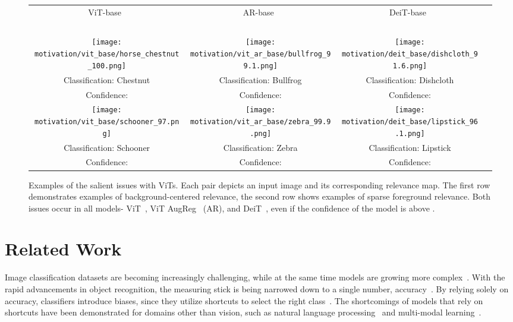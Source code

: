 \documentclass{article}
\begin{document}
\begin{figure*}[t]
  \centering
\begin{tabular}{c@{~~~~~~~~~~}c@{~~~~~~~~~~}c@{~}c}
ViT-base~\cite{dosovitskiy2020image} & AR-base~\cite{Steiner2021HowTT} & DeiT-base~\cite{touvron2020training}\\
~\\
\texttt{[image: motivation/vit\_base/horse\_chestnut\_100.png]}&
\texttt{[image: motivation/vit\_ar\_base/bullfrog\_99.1.png]}&
\texttt{[image: motivation/deit\_base/dishcloth\_91.6.png]}
\\
\small{Classification: Chestnut} &
\small{Classification: Bullfrog} &
\small{Classification: Dishcloth}
\\
\small{Confidence: } &
\small{Confidence: }
&
\small{Confidence: }
\\
\texttt{[image: motivation/vit\_base/schooner\_97.png]}&
\texttt{[image: motivation/vit\_ar\_base/zebra\_99.9.png]}&

\texttt{[image: motivation/deit\_base/lipstick\_96.1.png]}
\\
\small{Classification: Schooner} &
\small{Classification: Zebra} &
\small{Classification: Lipstick}
\\
\small{Confidence: } &
\small{Confidence: } &
\small{Confidence: }
\end{tabular}
\caption{Examples of the salient issues with ViTs. Each pair depicts an input image and its corresponding relevance map. The first row demonstrates examples of background-centered relevance, the second row shows examples of sparse foreground relevance. Both issues occur in all models- ViT~\cite{dosovitskiy2020image}, ViT AugReg~\cite{Steiner2021HowTT} (AR), and DeiT~\cite{touvron2020training}, even if the confidence of the model is above .
\label{fig:motivation}}
\vspace{-14px}
\end{figure*}

\section{Related Work}

Image classification datasets are becoming increasingly challenging, while at the same time models are growing more complex~\cite{Deng2009ImageNetAL, krizhevsky2012imagenet,7298594, resnets}. With the rapid advancements in object recognition, the measuring stick is being narrowed down to a single number, accuracy~\cite{torralba2011unbiased}. By relying solely on accuracy, classifiers introduce biases, since they utilize shortcuts to select the right class~\cite{lapuschkin2019unmasking, Geirhos2020ShortcutLI}. The shortcomings of models that rely on shortcuts have been demonstrated for domains other than vision, such as natural language processing~\cite{feng2018pathologies} and multi-modal learning~\cite{gat2021perceptual}. 
\end{document}
